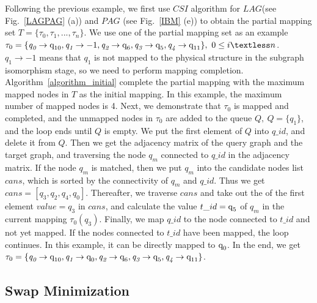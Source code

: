 \documentclass[runningheads]{llncs}
\begin{document}
	\begin{example}
		Following the previous example, we first use  $CSI$ algorithm for $LAG$(see Fig.~\ref{LAGPAG} (a)) and $PAG$ (see Fig.~\ref{IBM} (e)) to obtain the partial mapping set $T=\{\tau_{0},\tau_{1},...,\tau_{n}\}$. We use one of the partial mapping set as an example
$\tau_{0}=\{\textit{q}_\textit{0}\rightarrow \textup{q}_{\textup{10}},\textit{q}_\textit{1}\rightarrow -1,
	\textit{q}_\textit{2}\rightarrow \textup{q}_{\textup{6}},\textit{q}_\textit{3}\rightarrow \textup{q}_{\textup{5}},\textit{q}_\textit{4}\rightarrow \textup{q}_{\textup{11}}\}, \ 0 \le i \textless n$. 
	$\textit{q}_\textit{1}\rightarrow -1$ means that $\textit{q}_\textit{1}$ is not mapped to the physical structure in the subgraph isomorphism stage,	so we need to perform mapping completion. Algorithm~\ref{algorithm_initial} complete the partial mapping with the maximum mapped nodes in $T$ as the initial mapping. In this example, the maximum number of mapped nodes is 4. Next, we demonstrate that $\tau_{0}$ is mapped and completed, and the unmapped nodes in $\tau_{0}$ are added to the queue $Q, \ Q=\{\textit{q}_\textit{1}\}$, and the loop ends until $Q$ is empty. We put the first element of $Q$ into $q\_id$, and delete it from $Q$.  
	Then we get the adjacency matrix of the query graph and the target graph, and traversing the node $\textit{q}_\textit{m}$ connected to $q\_id$ in the adjacency matrix. If the node $\textit{q}_\textit{m}$ is matched, then we put $\textit{q}_\textit{m}$ into the candidate nodes list $cans$, which is sorted by the connectivity of $\textit{q}_\textit{m}$ and $q\_id$. Thus we get $cans=[\textit{q}_\textit{3},\textit{q}_\textit{2},\textit{q}_\textit{4},\textit{q}_\textit{0}]$.	Thereafter, we traverse $cans$ and take out the of the first element $value=\textit{q}_\textit{3}$ in $cans$, and calculate the value $t\_id=\textup{q}_{\textup{5}}$ of $\textit{q}_\textit{m}$ in the current mapping $\tau_{0}(\textit{q}_\textit{3})$. Finally, we map $q\_id$ to the node connected to $t\_id$ and not yet mapped. If the nodes connected to $t\_id$ have been mapped, the loop continues. In this example, it can be directly mapped to $\textup{q}_{\textup{0}}$. In the end, we get $ \tau_{0}=\{\textit{q}_\textit{0}\rightarrow  \textup{q}_{10},\textit{q}_\textit{1}\rightarrow \textup{q}_{0},	\textit{q}_\textit{2}\rightarrow  \textup{q}_{\textup{6}},\textit{q}_\textit{3}\rightarrow  \textup{q}_{\textup{5}},\textit{q}_\textit{4}\rightarrow  \textup{q}_{\textup{11}}\}$.
	\end{example}
\subsection{Swap Minimization}
\end{document}
